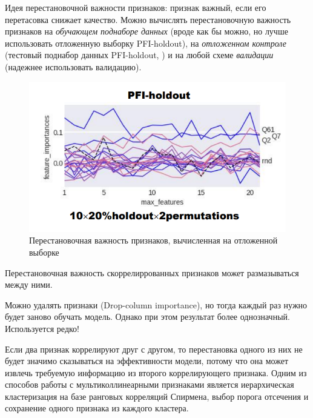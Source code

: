 \documentclass[%
	11pt,
	a4paper,
	utf8,
		]{article}
\begin{document}

Идея перестановочной важности признаков: признак важный, если его перетасовка снижает качество. Можно вычислять перестановочную важность признаков на \emph{обучающем поднаборе данных} (вроде как бы можно, но лучше использовать отложенную выборку PFI-holdout), на \emph{отложенном контроле} (тестовый поднабор данных PFI-holdout, ) и на любой схеме \emph{валидации} (надежнее использовать валидацию). 

\begin{figure}[h]
	\centering
	\includegraphics[scale=1.]{figures/PFI-holdout.png}
	\caption{ Перестановочная важность признаков, вычисленная на отложенной выборке }\label{fig:PFI-holdout}
\end{figure}

Перестановочная важность скоррелиррованных признаков может размазываться между ними.

Можно удалять признаки (Drop-column importance), но тогда каждый раз нужно будет заново обучать модель. Однако при этом результат более однозначный. Используется редко!

Если два признак коррелируют друг с другом, то перестановка одного из них не будет значимо сказываться на эффективности модели, потому что она может извлечь требуемую информацию из второго коррелирующего признака. Одним из способов работы с мультиколлинеарными признаками является иерархическая кластеризация на базе ранговых корреляций Спирмена, выбор порога отсечения и сохранение одного признака из каждого кластера.

\end{document}
